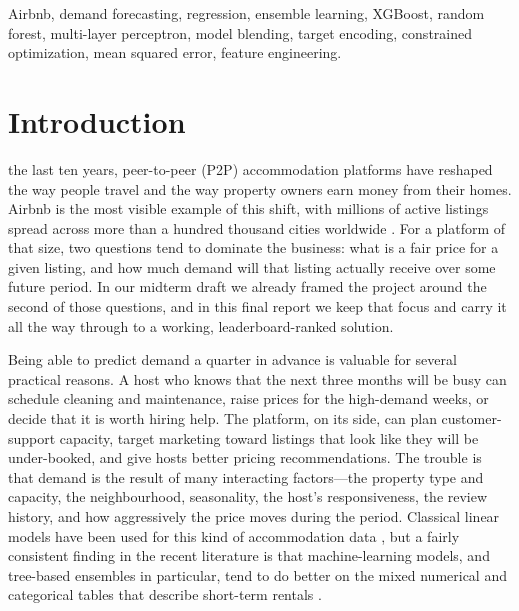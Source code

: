 \documentclass[journal]{IEEEtran}
\begin{document}
\begin{IEEEkeywords}
Airbnb, demand forecasting, regression, ensemble learning, XGBoost, random
forest, multi-layer perceptron, model blending, target encoding, constrained
optimization, mean squared error, feature engineering.
\end{IEEEkeywords}

\section{Introduction}
 the last ten years, peer-to-peer (P2P) accommodation
platforms have reshaped the way people travel and the way property owners earn
money from their homes. Airbnb is the most visible example of this shift, with
millions of active listings spread across more than a hundred thousand cities
worldwide \cite{adamiak2018}. For a platform of that size, two questions tend
to dominate the business: what is a fair price for a given listing, and how
much demand will that listing actually receive over some future period. In our
midterm draft we already framed the project around the second of those
questions, and in this final report we keep that focus and carry it all the way
through to a working, leaderboard-ranked solution.

Being able to predict demand a quarter in advance is valuable for several
practical reasons. A host who knows that the next three months will be busy can
schedule cleaning and maintenance, raise prices for the high-demand weeks, or
decide that it is worth hiring help. The platform, on its side, can plan
customer-support capacity, target marketing toward listings that look like they
will be under-booked, and give hosts better pricing recommendations. The
trouble is that demand is the result of many interacting factors---the property
type and capacity, the neighbourhood, seasonality, the host's responsiveness,
the review history, and how aggressively the price moves during the period.
Classical linear models have been used for this kind of accommodation data
\cite{gunter2018,wang2017}, but a fairly consistent finding in the recent
literature is that machine-learning models, and tree-based ensembles in
particular, tend to do better on the mixed numerical and categorical tables
that describe short-term rentals \cite{tang2024,camatti2024,kalehbasti2019}.
\end{document}
